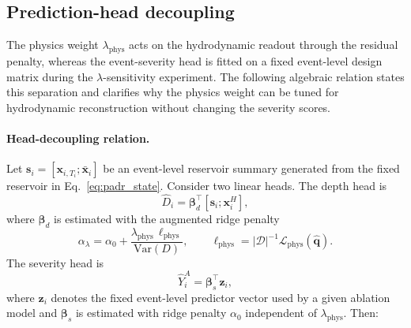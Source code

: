 \documentclass[pdflatex,sn-mathphys-ay]{sn-jnl}
\theoremstyle{thmstyleone}
\begin{document}
\subsection{Prediction-head decoupling}
\label{subsec:head_decoupling}

The physics weight $\lambda_{\mathrm{phys}}$ acts on the hydrodynamic
readout through the residual penalty, whereas the event-severity head
is fitted on a fixed event-level design matrix during the
$\lambda$-sensitivity experiment.  The following algebraic relation states this separation and clarifies
why the physics weight can be tuned for hydrodynamic reconstruction
without changing the severity scores.

\paragraph{Head-decoupling relation.}
Let
$\mathbf{s}_{i}=[\mathbf{x}_{i,T_i};\bar{\mathbf{x}}_{i}]$ be an
event-level reservoir summary generated from the fixed reservoir in
Eq.~\eqref{eq:padr_state}.  Consider two linear heads.  The depth head
is
\begin{equation}
  \hat{D}_{i}
  =
  \boldsymbol{\beta}_{d}^{\top}
  [\mathbf{s}_{i};\mathbf{x}^{H}_{i}],
  \label{eq:depth_head}
\end{equation}
where $\boldsymbol{\beta}_{d}$ is estimated with the augmented ridge
penalty
\begin{equation}
  \alpha_{\lambda}
  =
  \alpha_{0}
  +
  \frac{\lambda_{\mathrm{phys}}\,\ell_{\mathrm{phys}}}
  {\mathrm{Var}(D)},
  \qquad
  \ell_{\mathrm{phys}}
  =
  |\mathcal{D}|^{-1}
  \mathcal{L}_{\mathrm{phys}}(\hat{\mathbf{q}}).
  \label{eq:depth_ridge_augmented}
\end{equation}
The severity head is
\begin{equation}
  \hat{Y}^{A}_{i}
  =
  \boldsymbol{\beta}_{s}^{\top}
  \mathbf{z}_{i},
  \label{eq:severity_head}
\end{equation}
where $\mathbf{z}_{i}$ denotes the fixed event-level predictor vector
used by a given ablation model and
$\boldsymbol{\beta}_{s}$ is estimated with ridge penalty $\alpha_{0}$
independent of $\lambda_{\mathrm{phys}}$.
Then:
\end{document}
